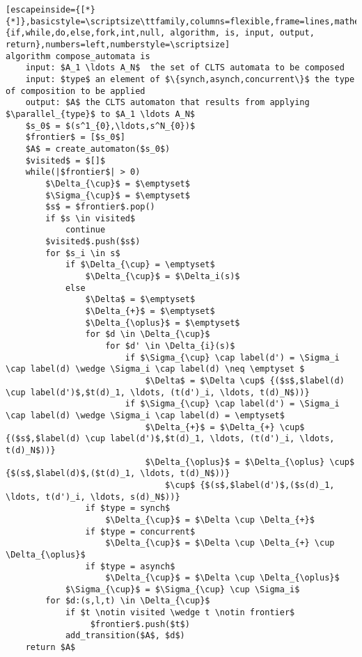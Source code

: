 \renewcommand{\ttdefault}{pcr}
\begin{lstlisting}[escapeinside={[*}{*]},basicstyle=\scriptsize\ttfamily,columns=flexible,frame=lines,mathescape=true,xleftmargin=3.0ex,keywordstyle=\textbf,morekeywords={if,while,do,else,fork,int,null, algorithm, is, input, output, return},numbers=left,numberstyle=\scriptsize]
algorithm compose_automata is
	input: $A_1 \ldots A_N$  the set of CLTS automata to be composed
	input: $type$ an element of $\{synch,asynch,concurrent\}$ the type of composition to be applied
	output: $A$ the CLTS automaton that results from applying $\parallel_{type}$ to $A_1 \ldots A_N$
	$s_0$ = $(s^1_{0},\ldots,s^N_{0})$
	$frontier$ = [$s_0$]
	$A$ = create_automaton($s_0$)
	$visited$ = $[]$
	while(|$frontier$| > 0)
		$\Delta_{\cup}$ = $\emptyset$
		$\Sigma_{\cup}$ = $\emptyset$		
		$s$ = $frontier$.pop()
		if $s \in visited$
			continue
		$visited$.push($s$)
		for $s_i \in s$ 
			if $\Delta_{\cup} = \emptyset$
				$\Delta_{\cup}$ = $\Delta_i(s)$
			else 
				$\Delta$ = $\emptyset$
				$\Delta_{+}$ = $\emptyset$
				$\Delta_{\oplus}$ = $\emptyset$
				for $d \in \Delta_{\cup}$
					for $d' \in \Delta_{i}(s)$
						if $\Sigma_{\cup} \cap label(d') = \Sigma_i \cap label(d) \wedge \Sigma_i \cap label(d) \neq \emptyset $
							$\Delta$ = $\Delta \cup$ {($s$,$label(d) \cup label(d')$,$t(d)_1, \ldots, (t(d')_i, \ldots, t(d)_N$))}
						if $\Sigma_{\cup} \cap label(d') = \Sigma_i \cap label(d) \wedge \Sigma_i \cap label(d) = \emptyset$
							$\Delta_{+}$ = $\Delta_{+} \cup$ {($s$,$label(d) \cup label(d')$,$t(d)_1, \ldots, (t(d')_i, \ldots, t(d)_N$))}
							$\Delta_{\oplus}$ = $\Delta_{\oplus} \cup$ {$(s$,$label(d)$,($t(d)_1, \ldots, t(d)_N$))} 
								$\cup$ {$(s$,$label(d')$,($s(d)_1, \ldots, t(d')_i, \ldots, s(d)_N$))}
				if $type = synch$
					$\Delta_{\cup}$ = $\Delta \cup \Delta_{+}$
				if $type = concurrent$
					$\Delta_{\cup}$ = $\Delta \cup \Delta_{+} \cup \Delta_{\oplus}$					
				if $type = asynch$
					$\Delta_{\cup}$ = $\Delta \cup \Delta_{\oplus}$					
			$\Sigma_{\cup}$ = $\Sigma_{\cup} \cup \Sigma_i$
		for $d:(s,l,t) \in \Delta_{\cup}$
			if $t \notin visited \wedge t \notin frontier$ 
				 $frontier$.push($t$)
			add_transition($A$, $d$)			
	return $A$

\end{lstlisting}
